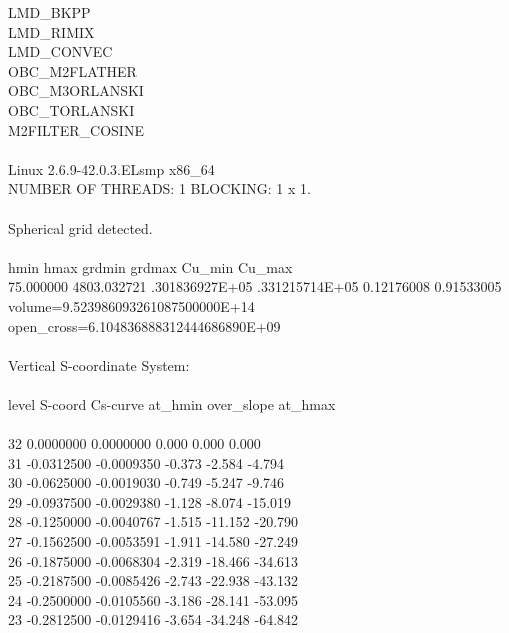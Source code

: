           LMD\_BKPP\\
          LMD\_RIMIX\\
          LMD\_CONVEC\\
          OBC\_M2FLATHER\\
          OBC\_M3ORLANSKI\\
          OBC\_TORLANSKI\\
          M2FILTER\_COSINE\\
\\
Linux 2.6.9-42.0.3.ELsmp x86\_64\\
 NUMBER OF THREADS:  1 BLOCKING:  1 x  1.\\
\\
 Spherical grid detected.\\
\\
 hmin        hmax         grdmin         grdmax         Cu\_min      Cu\_max\\
   75.000000  4803.032721 .301836927E+05 .331215714E+05  0.12176008  0.91533005\\
   volume=9.523986093261087500000E+14   open\_cross=6.104836888312444686890E+09\\
\\
 Vertical S-coordinate System:\\
\\
 level   S-coord     Cs-curve          at\_hmin  over\_slope     at\_hmax\\
\\
    32   0.0000000   0.0000000           0.000       0.000       0.000\\
    31  -0.0312500  -0.0009350          -0.373      -2.584      -4.794\\
    30  -0.0625000  -0.0019030          -0.749      -5.247      -9.746\\
    29  -0.0937500  -0.0029380          -1.128      -8.074     -15.019\\
    28  -0.1250000  -0.0040767          -1.515     -11.152     -20.790\\
    27  -0.1562500  -0.0053591          -1.911     -14.580     -27.249\\
    26  -0.1875000  -0.0068304          -2.319     -18.466     -34.613\\
    25  -0.2187500  -0.0085426          -2.743     -22.938     -43.132\\
    24  -0.2500000  -0.0105560          -3.186     -28.141     -53.095\\
    23  -0.2812500  -0.0129416          -3.654     -34.248     -64.842\\
